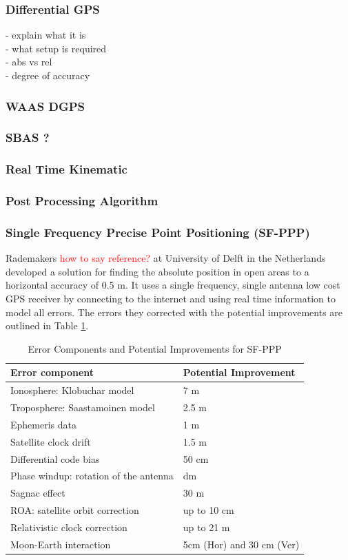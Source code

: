 \documentclass[11pt,a4paper]{article}
\begin{document}
\subsubsection{Differential GPS}
- explain what it is\\
- what setup is required \\
- abs vs rel \\
- degree of accuracy
\subsubsection{WAAS DGPS}

\subsubsection{SBAS  ?}

\subsubsection{Real Time Kinematic}

\subsubsection{Post Processing Algorithm}

\subsubsection{Single Frequency Precise Point Positioning (SF-PPP)}
Rademakers \textcolor{red}{how to say reference?} at University of Delft in the Netherlands developed a solution for finding the absolute position in open areas to a horizontal accuracy of 0.5 m. It uses a single frequency, single antenna low cost GPS receiver by connecting to the internet and using real time information to model all errors. The errors they corrected with the potential improvements are outlined in Table \ref{Table:SFPPP error table}. 
\begin{table}
\centering
\caption{Error Components and Potential Improvements for SF-PPP}
\label{Table:SFPPP error table}
\begin{tabular}{|l|l|}
\hline
\textbf{Error component} &\textbf{ Potential Improvement} \\\hline
 Ionosphere: Klobuchar model & 7 m \\\hline
 Troposphere: Saastamoinen model & 2.5 m \\\hline
Ephemeris data &  1 m \\\hline
 Satellite clock drift & 1.5 m \\\hline
 Differential code bias & 50 cm \\\hline
 Phase windup: rotation of the antenna & dm \\\hline
 Sagnac effect & 30 m \\\hline
 ROA: satellite orbit correction & up to 10 cm \\\hline
 Relativistic clock correction & up to 21 m \\\hline
 Moon-Earth interaction & 5cm (Hor) and 30 cm (Ver)\\\hline
\end{tabular}
\end{table}
\end{document}

